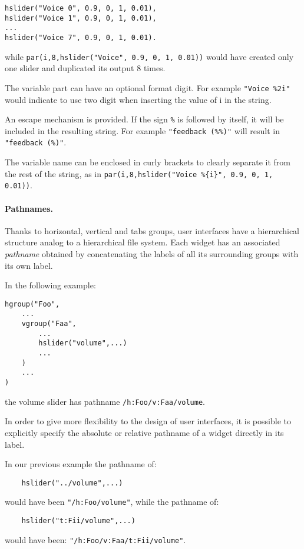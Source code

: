\begin{lstlisting}
hslider("Voice 0", 0.9, 0, 1, 0.01),
hslider("Voice 1", 0.9, 0, 1, 0.01),
...
hslider("Voice 7", 0.9, 0, 1, 0.01).
\end{lstlisting}

while \lstinline'par(i,8,hslider("Voice", 0.9, 0, 1, 0.01))' would have created only one slider and duplicated its output 8 times.

The variable part can have an optional format digit. 
For example \lstinline'"Voice %2i"' would indicate to use two digit when inserting the value of i in the string.

An escape mechanism is provided.
If the sign \lstinline'%' is followed by itself, it will be included in the resulting string.
For example \lstinline'"feedback (%%)"' will result in \lstinline'"feedback (%)"'.

The variable name can be enclosed in curly brackets to clearly separate it from the rest of the string, as in \lstinline'par(i,8,hslider("Voice %{i}", 0.9, 0, 1, 0.01))'.



\paragraph{Pathnames.}
Thanks to horizontal, vertical and tabs groups, user interfaces have a hierarchical structure analog to a hierarchical file system. Each widget has an associated \textit{pathname} obtained by concatenating the labels of all its surrounding groups with its own label.

In the following example:
\begin{lstlisting}
hgroup("Foo",
	...
	vgroup("Faa", 
		...
		hslider("volume",...)
		...
	)
	...
)
\end{lstlisting}
the volume slider has pathname \lstinline'/h:Foo/v:Faa/volume'.

In order to give more flexibility to the design of user interfaces, it is possible to explicitly specify the absolute or relative pathname of a widget directly in its label. 

In our previous example the pathname of:
\begin{lstlisting}
	hslider("../volume",...)
\end{lstlisting}
would have been \lstinline'"/h:Foo/volume"', while the pathname of:
\begin{lstlisting}
	hslider("t:Fii/volume",...)
\end{lstlisting}
would have been: 
\lstinline'"/h:Foo/v:Faa/t:Fii/volume"'.

